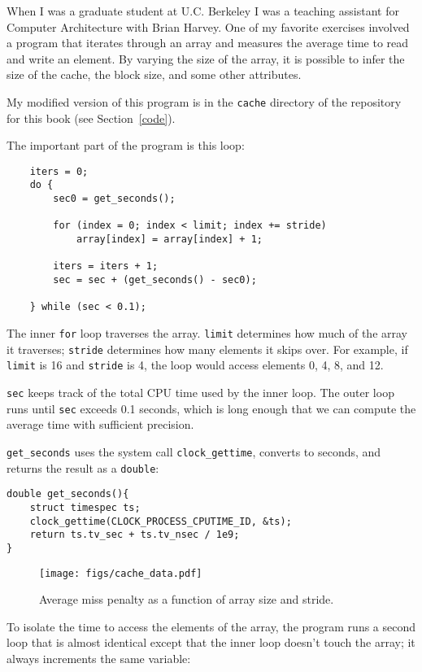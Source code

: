 \documentclass[12pt]{book}
\begin{document}
When I was a graduate student at U.C. Berkeley I was a teaching
assistant for Computer Architecture with Brian Harvey.  One of my
favorite exercises involved a program that iterates through an array
and measures the average time to read and write an element.  By
varying the size of the array, it is possible to infer the size
of the cache, the block size, and some other attributes.

My modified version of this program is in the {\tt cache} directory
of the repository for this
book (see Section~\ref{code}).

The important part of the program is this loop:

\begin{verbatim}
    iters = 0;
    do {
        sec0 = get_seconds();

        for (index = 0; index < limit; index += stride) 
            array[index] = array[index] + 1;
        
        iters = iters + 1; 
        sec = sec + (get_seconds() - sec0);
        
    } while (sec < 0.1);
\end{verbatim}

The inner {\tt for} loop traverses the array.  {\tt limit}
determines how much of the array it traverses; {\tt stride}
determines how many elements it skips over.  For example, if
{\tt limit} is 16 and {\tt stride} is 4, the loop would access
elements 0, 4, 8, and 12.

{\tt sec} keeps track of the total CPU time used by the inner loop.
The outer loop runs until {\tt sec} exceeds 0.1 seconds, which is
long enough that we can compute the average time with sufficient
precision.

\verb"get_seconds" uses the system call \verb"clock_gettime",
converts to seconds, and returns the result as a {\tt double}:

\begin{verbatim}
double get_seconds(){
    struct timespec ts;
    clock_gettime(CLOCK_PROCESS_CPUTIME_ID, &ts);
    return ts.tv_sec + ts.tv_nsec / 1e9;
}
\end{verbatim}

\begin{figure}
\centerline{\texttt{[image: figs/cache\_data.pdf]}}
\caption{Average miss penalty as a function of array size and stride.}
\label{cachedata}
\end{figure}

To isolate the time to access the elements of the array,
the program runs a second loop that is almost identical except
that the inner loop doesn't touch the array; it always increments
the same variable:
\end{document}
